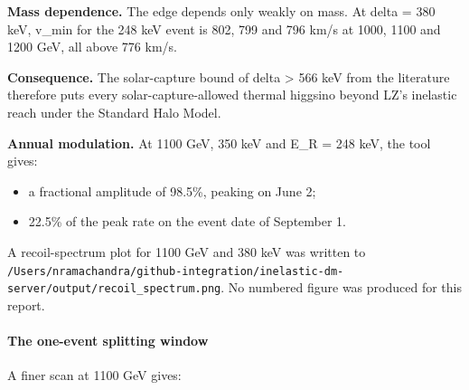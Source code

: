 \documentclass[11pt,a4paper]{article}
\begin{document}
\textbf{Mass dependence.} The edge depends only weakly on mass. At delta = 380 keV, v\_min for the 248 keV event is 802, 799 and 796 km/s at 1000, 1100 and 1200 GeV, all above 776 km/s.

\textbf{Consequence.} The solar-capture bound of delta \textgreater{} 566 keV from the literature therefore puts every solar-capture-allowed thermal higgsino beyond LZ's inelastic reach under the Standard Halo Model.

\textbf{Annual modulation.} At 1100 GeV, 350 keV and E\_R = 248 keV, the tool gives:

\begin{itemize}
  \item a fractional amplitude of 98.5\%, peaking on June 2;
  \item 22.5\% of the peak rate on the event date of September 1.
\end{itemize}
A recoil-spectrum plot for 1100 GeV and 380 keV was written to \texttt{/\allowbreak{}Users/\allowbreak{}nramachandra/\allowbreak{}github-integration/\allowbreak{}inelastic-dm-server/\allowbreak{}output/\allowbreak{}recoil\_\allowbreak{}spectrum.png}. No numbered figure was produced for this report.

\paragraph{The one-event splitting window}
A finer scan at 1100 GeV gives:
\end{document}
